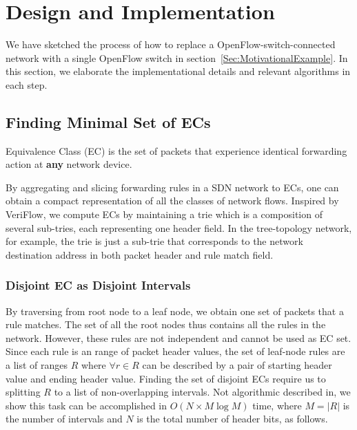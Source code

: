 \section{Design and Implementation}

We have sketched the process of how to replace a OpenFlow-switch-connected network
with a single OpenFlow switch in section~\ref{Sec:MotivationalExample}.
In this section, we elaborate the implementational details and relevant algorithms
in each step.

\subsection{Finding Minimal Set of ECs}

\begin{definition}
Equivalence Class (EC) is the set of packets that
experience identical forwarding action at \textbf{any} network device.
\end{definition}

By aggregating and slicing forwarding rules in a SDN network to ECs,
one can obtain a compact representation of all the classes of network flows.
Inspired by VeriFlow\cite{Veriflow}, we compute ECs by maintaining a trie
which is a composition of several sub-tries, each representing one header field.
In the tree-topology network, for example, the trie is just a sub-trie that
corresponds to the network destination address in both packet header and rule match field.

\subsubsection{Disjoint EC as Disjoint Intervals}
By traversing from root node to a leaf node, we obtain one set of packets
that a rule matches.
The set of all the root nodes thus contains all the rules in the network.
However, these rules are not independent and cannot be used as EC set.
Since each rule is an range of packet header values,
the set of leaf-node rules are a list of ranges $R$ where $\forall r \in R$ can be
described by a pair of starting header value and ending header value.
Finding the set of disjoint ECs require us to splitting $R$ to
a list of non-overlapping intervals.
Not algorithmic described in\cite{Veriflow},
we show this task can be accomplished in $O(N \times M\log M)$ time,
where $M=|R|$ is the number of intervals and $N$ is the total number of header bits,
as follows\cite{SplitDisjointInterval}.


